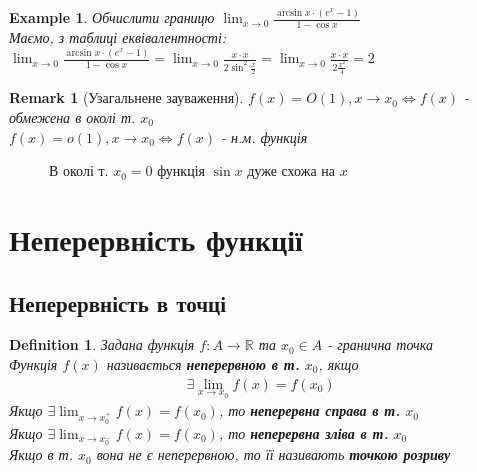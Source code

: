 \documentclass[a4paper, 14pt]{extarticle}
\def\huge{\displaystyle}
\theoremstyle{theoremdd}
\theoremstyle{theoremdd}
\newtheorem{definition}[theorem]{Definition}
\theoremstyle{theoremdd}
\theoremstyle{theoremdd}
\newtheorem{example}[theorem]{Example}
\theoremstyle{theoremdd}
\theoremstyle{theoremdd}
\newtheorem{remark}[theorem]{Remark}
\theoremstyle{theoremdd}
\theoremstyle{theoremdd}
\begin{document}
\begin{example}
Обчислити границю $\huge \lim_{x \to 0} \frac{\arcsin x \cdot (e^x - 1)}{1 - \cos x}$\\
Маємо, з таблиці еквівалентності:\\
$\huge \lim_{x \to 0} \frac{\arcsin x \cdot (e^x - 1)}{1 - \cos x} = \lim_{x \to 0} \frac{x \cdot x}{2 \sin^2 \frac{x}{2}} = \lim_{x \to 0} \frac{x \cdot x}{2 \frac{x^2}{4}} = 2$
\end{example}

\begin{remark}[Узагальнене зауваження]
$f(x) = O(1), x \to x_0 \iff f(x)$ - обмежена в околі т. $x_0$\\
$f(x) = o(1), x \to x_0 \iff f(x)$ - н.м. функція
\end{remark}

\begin{figure} [H]
\centering
{
\caption*{В околі т. $x_0 = 0$ функція $\sin x$ дуже схожа на $x$}
}
\end{figure}
\newpage	

\section{Неперервність функції}
\subsection{Неперервність в точці}
\begin{definition}
Задана функція $f: A \to \mathbb{R}$ та $x_0 \in A$ - гранична точка\\
Функція $f(x)$ називається \textbf{неперервною в т.} $x_0$, якщо
\begin{align*}
\exists \lim_{x \to x_0} f(x) = f(x_0)
\end{align*}
Якщо $\huge \exists \lim_{x \to x_0^+} f(x) = f(x_0)$, то \textbf{неперервна справа в т.} $x_0$\\
Якщо $\huge \exists \lim_{x \to x_0^-} f(x) = f(x_0)$, то \textbf{неперервна зліва в т.} $x_0$\\
Якщо в т. $x_0$ вона не є неперервною, то її називають \textbf{точкою розриву}
\end{definition}
\end{document}
